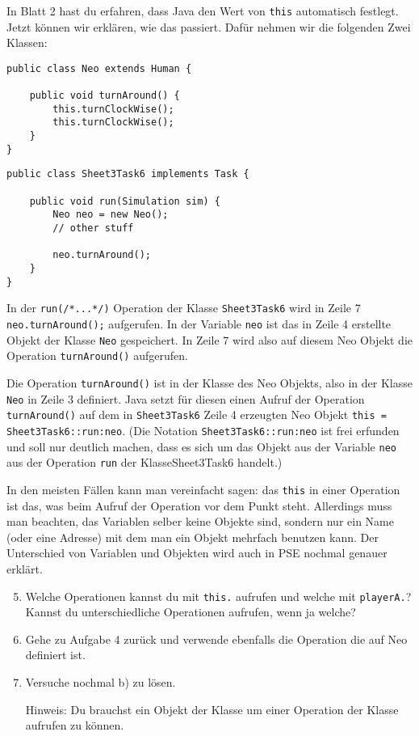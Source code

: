\begin{Infobox}
	In Blatt 2 hast du erfahren, dass Java den Wert von \lstinline{this} automatisch festlegt.
	Jetzt können wir erklären, wie das passiert.
	Dafür nehmen wir die folgenden Zwei Klassen:

	\begin{lstlisting}[xleftmargin=0.5cm]
public class Neo extends Human {

    public void turnAround() {
        this.turnClockWise();
        this.turnClockWise();
    }
}
	\end{lstlisting}

	\begin{lstlisting}[xleftmargin=0.5cm]
public class Sheet3Task6 implements Task {
    
    public void run(Simulation sim) {
        Neo neo = new Neo();
        // other stuff
        
        neo.turnAround();
    }
}
	\end{lstlisting}

	In der \lstinline{run(/*...*/)} Operation der Klasse \lstinline{Sheet3Task6} wird in Zeile 7 \lstinline{neo.turnAround();} aufgerufen.
	In der Variable \lstinline{neo} ist das in Zeile 4 erstellte Objekt der Klasse \lstinline{Neo} gespeichert.
	In Zeile 7 wird also auf diesem Neo Objekt die Operation \lstinline{turnAround()} aufgerufen.

	Die Operation \lstinline{turnAround()} ist in der Klasse des Neo Objekts, also in der Klasse \lstinline{Neo} in Zeile 3 definiert.
	Java setzt für diesen einen Aufruf der Operation \lstinline{turnAround()} auf dem in \lstinline{Sheet3Task6} Zeile 4 erzeugten Neo Objekt \lstinline{this = Sheet3Task6::run:neo}.
	(Die Notation \lstinline{Sheet3Task6::run:neo} ist frei erfunden und soll nur deutlich machen, dass es sich um das Objekt aus der Variable \lstinline{neo} aus der Operation \lstinline{run} der Klasse{Sheet3Task6} handelt.)

	In den meisten Fällen kann man vereinfacht sagen: das \lstinline{this} in einer Operation ist das, was beim Aufruf der Operation vor dem Punkt steht.
	Allerdings muss man beachten, das Variablen selber keine Objekte sind, sondern nur ein Name (oder eine Adresse) mit dem man ein Objekt mehrfach benutzen kann.
	Der Unterschied von Variablen und Objekten wird auch in PSE nochmal genauer erklärt.

\end{Infobox}


\begin{enumerate}\setcounter{enumi}{4}
	\item \optional Welche Operationen kannst du mit \lstinline{this.} aufrufen und welche mit \lstinline{playerA.}? 
		Kannst du unterschiedliche Operationen aufrufen, wenn ja welche?

	\item 
		Gehe zu Aufgabe 4 zurück und verwende ebenfalls die Operation die auf Neo definiert ist.
	\item \optional Versuche nochmal b) zu lösen.

		Hinweis: Du brauchst ein Objekt der Klasse um einer Operation der Klasse aufrufen zu können.
\end{enumerate}
